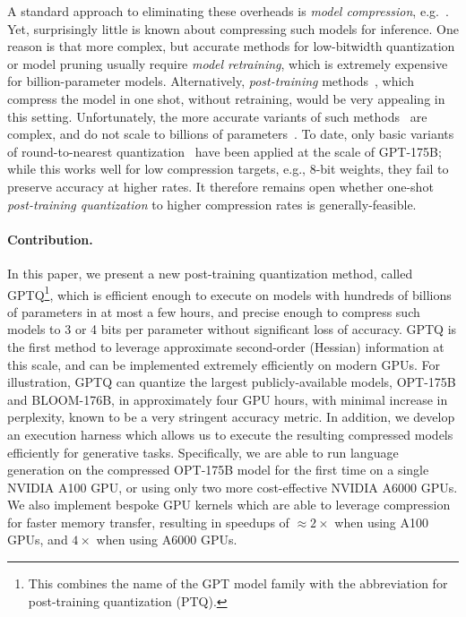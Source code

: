 A standard approach to eliminating these overheads is \emph{model compression}, e.g.~\cite{hoefler2021sparsity, gholami2021survey}. Yet, surprisingly little is known about compressing such models for inference. One reason is that more complex, but accurate methods for low-bitwidth quantization or model pruning usually require \emph{model retraining}, which is extremely expensive for billion-parameter models. Alternatively, \emph{post-training} methods~\cite{nagel2020up, wang2020towards, hubara2020improving, nahshan2021loss}, which compress the model in one shot, without retraining, would be very appealing in this setting. Unfortunately, the more accurate variants of such methods~\cite{li2021brecq,hubara2021accurate,frantar2022obc} are complex, and do not scale to billions of parameters~\cite{yao2022zeroquant}. To date, only basic variants of round-to-nearest quantization~\cite{yao2022zeroquant, dettmers2022llm} have been applied at the scale of GPT-175B; while this works well for low compression targets, e.g., 8-bit weights, they fail to preserve accuracy at higher rates. It therefore remains open whether one-shot \emph{post-training quantization} to higher compression rates is generally-feasible. 

\paragraph{Contribution.} In this paper, we present a new post-training quantization method, called GPTQ\footnote{This combines the name of the GPT model family with the abbreviation for post-training quantization (PTQ).}, which is efficient enough to execute on models with hundreds of billions of parameters in at most a few hours, and precise enough to compress such models to 3 or 4 bits per parameter without significant loss of accuracy. GPTQ is the first method to leverage approximate second-order (Hessian) information at this scale, and can be implemented extremely efficiently on modern GPUs. For illustration, GPTQ can quantize the largest publicly-available models, OPT-175B and BLOOM-176B, in approximately four GPU hours, with minimal increase in perplexity, known to be a very stringent accuracy metric. In addition, we develop an execution harness which allows us to execute the resulting compressed models efficiently for generative tasks. Specifically, we are able to run language generation on the compressed OPT-175B model for the first time on a single NVIDIA A100 GPU, or using only two more cost-effective NVIDIA A6000 GPUs. We also implement bespoke GPU kernels which are able to leverage compression for faster memory transfer, resulting in speedups of $\approx 2 \times$ when using A100 GPUs, and $4\times$ when using A6000 GPUs.

